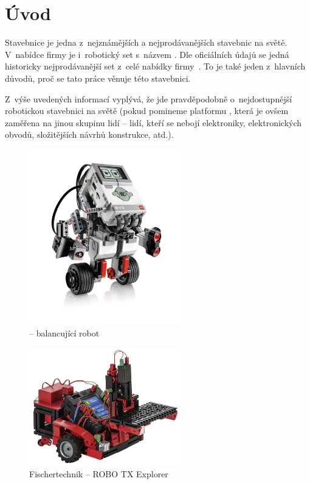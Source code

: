 \chapter{Úvod}

Stavebnice \lego{ }je jedna z~nejznámějších a nejprodávanějších stavebnic na světě. 
V~nabídce firmy \lego{ }je i~robotický set s~názvem \legoM. 
Dle oficiálních údajů se jedná historicky nejprodávanější set z~celé nabídky firmy~\cite{legoGizmodo_SalesStatistic}. 
To je také jeden z~hlavních důvodů, proč se tato práce věnuje této stavebnici. 

Z~výše uvedených informací vyplývá, že jde pravděpodobně o~nejdostupnější robotickou stavebnici na světě (pokud pomineme platformu \arduino, která je ovšem zaměřena na jinou skupinu lidí -- lidí, kteří se nebojí elektroniky, elektronických obvodů, složitějších návrhů konstrukce, atd.).

\begin{figure}[h]
	\centering
	\includegraphics[width=250px]{images/lego-mindstorms-ev3_Robotics-for-Kids.png}
	\caption[\legoEV{ }-- samobalancující robot]{\legoEV{ }-- balancující robot\protect\footnotemark}
	\label{fig:lego-mindstorms-ev3_Robotics-for-Kids}
\end{figure}



\begin{figure}[h]
	\centering
	\includegraphics[width=250px]{images/fischertechnik_ROBO-TX-Explorer_02.jpg}
	\caption[Fischertechnik -- ROBO TX Explorer]{Fischertechnik -- ROBO TX Explorer\protect\footnotemark}
	\label{fig:fischertechnik_ROBO-TX-Explorer}
\end{figure}

